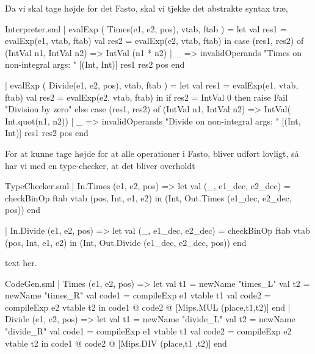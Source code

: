 \documentclass[11pt,a4paper,oneside]{report}
\begin{document}
Da vi skal tage højde for det Fasto, skal vi tjekke det abstrakte syntax træ,

\begin{code}[firstnumber=160]{Interpreter.sml}
| evalExp ( Times(e1, e2, pos), vtab, ftab ) =
    let
      val res1   = evalExp(e1, vtab, ftab)
      val res2   = evalExp(e2, vtab, ftab)
    in
      case (res1, res2) of
          (IntVal n1, IntVal n2) => IntVal (n1 * n2)
        | _ => invalidOperands
            "Times on non-integral args: "
                [(Int, Int)] res1 res2 pos
    end

| evalExp ( Divide(e1, e2, pos), vtab, ftab ) =
    let
      val res1   = evalExp(e1, vtab, ftab)
      val res2   = evalExp(e2, vtab, ftab)
    in
      if res2 = IntVal 0 then raise Fail "Division by zero"
        else
          case (res1, res2) of
            (IntVal n1, IntVal n2) => IntVal( Int.quot(n1, n2))
            | _ => invalidOperands
                "Divide on non-integral args: "
                    [(Int, Int)] res1 res2 pos
    end
\end{code}

For at kunne tage højde for at alle operationer i Fasto, bliver udført lovligt, så har vi med en type-checker, at det bliver overholdt

\begin{code}[firstnumber=160]{TypeChecker.sml}
| In.Times (e1, e2, pos)
  => let val (_, e1_dec, e2_dec) =
            checkBinOp ftab vtab (pos, Int, e1, e2)
     in (Int,
         Out.Times (e1_dec, e2_dec, pos))
     end

| In.Divide (e1, e2, pos)
  => let val (_, e1_dec, e2_dec) =
            checkBinOp ftab vtab (pos, Int, e1, e2)
     in (Int,
         Out.Divide (e1_dec, e2_dec, pos))
     end
\end{code}

text her.

\newpage

\begin{code}[firstnumber=133]{CodeGen.sml}
  | Times (e1, e2, pos) =>
      let val t1 = newName "times_L"
          val t2 = newName "times_R"
          val code1 = compileExp e1 vtable t1
          val code2 = compileExp e2 vtable t2
      in  code1 @ code2 @ [Mips.MUL (place,t1,t2)]
      end
  | Divide (e1, e2, pos) =>
      let val t1 = newName "divide_L"
          val t2 = newName "divide_R"
          val code1 = compileExp e1 vtable t1
          val code2 = compileExp e2 vtable t2
      in  code1 @ code2 @ [Mips.DIV (place,t1 ,t2)]
      end
\end{code}
\end{document}

